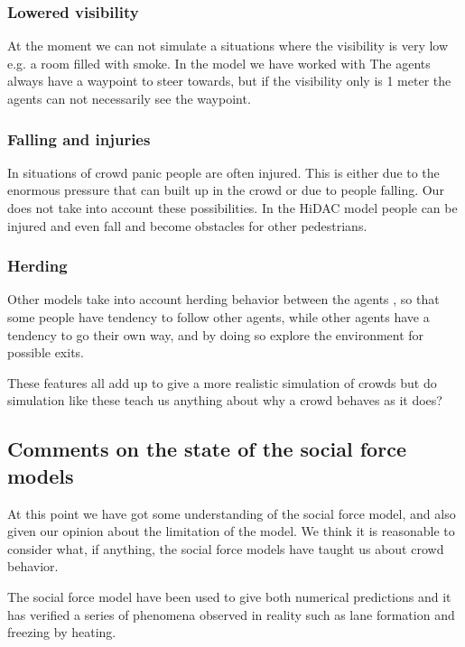 \subsubsection{Lowered visibility}
At the moment we can not simulate a situations where the visibility is very low 
e.g. a room filled with smoke. In the model we have worked with The agents always 
have a waypoint to steer towards, but if the visibility only is 1 meter the 
agents can not necessarily see the waypoint. %

\subsubsection{Falling and injuries}
In situations of crowd panic people are often injured. This is either due to the 
enormous pressure that can built up in the crowd or due to people falling. Our 
does not take into account these possibilities. In the HiDAC model people can 
be injured and even fall and become obstacles for other pedestrians.\cite{HiDAC}

\subsubsection{Herding}
Other models take into account herding behavior between the agents  
\cite{helbing00}, so that some people have tendency to follow other agents, 
while other agents have a tendency to go their own way,  and by doing so 
explore the environment for possible exits.

These features all add up to give a more realistic simulation of crowds 
but do simulation like these teach us anything about why a crowd behaves 
as it does?

\subsection{Comments on the state of the social force models}
At this point we have got some understanding of the social force model, and 
also given our opinion about the limitation of the model. We think it is 
reasonable to consider what, if anything, the social force models have taught 
us about crowd behavior. 

The social force model have been used to give both numerical predictions 
and it has verified a series of phenomena observed in reality such as 
lane formation and freezing by heating.

